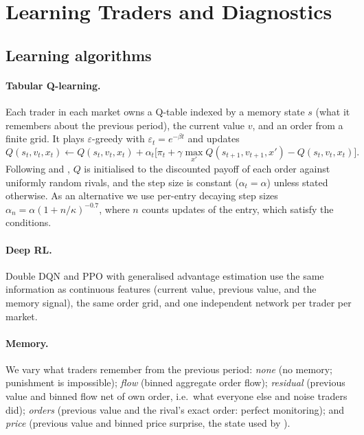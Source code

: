 \section{Learning Traders and Diagnostics}
\label{sec:method}

\subsection{Learning algorithms}

\paragraph{Tabular Q-learning.} Each trader in each market owns a Q-table
indexed by a memory state $s$ (what it remembers about the previous period),
the current value $v$, and an order from a finite grid. It plays
$\varepsilon$-greedy with $\varepsilon_t=e^{-\beta t}$ and updates
\[
Q(s_t,v_t,x_t)\leftarrow Q(s_t,v_t,x_t)+\alpha_t\Big[\pi_t+\gamma\max_{x'}Q(s_{t+1},v_{t+1},x')-Q(s_t,v_t,x_t)\Big].
\]
Following \citet{calvano2020} and \citet{dou2025}, $Q$ is initialised to the
discounted payoff of each order against uniformly random rivals, and the step
size is constant ($\alpha_t=\alpha$) unless stated otherwise. As an
alternative we use per-entry decaying step sizes
$\alpha_n=\alpha(1+n/\kappa)^{-0.7}$, where $n$ counts updates of the entry,
which satisfy the \citet{robbins1951} conditions.

\paragraph{Deep RL.} Double DQN \citep{mnih2015,vanhasselt2016} and PPO with
generalised advantage estimation \citep{schulman2017,schulman2016} use the same
information as continuous features (current value, previous value, and the
memory signal), the same order grid, and one independent network per trader
per market.

\paragraph{Memory.} We vary what traders remember from the previous period:
\emph{none} (no memory; punishment is impossible);
\emph{flow} (binned aggregate order flow);
\emph{residual} (previous value and binned flow net of own order, i.e.\ what
everyone else and noise traders did);
\emph{orders} (previous value and the rival's exact order: perfect monitoring);
and \emph{price} (previous value and binned price surprise, the state used by
\citet{dou2025}).

